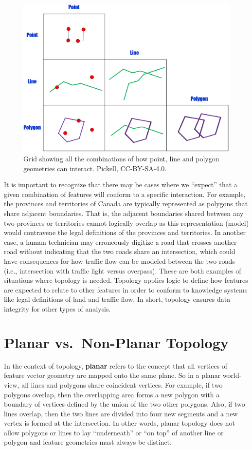 \documentclass[
]{book}
\begin{document}
\begin{figure}
\includegraphics[width=0.75\linewidth]{images/07-topology-grid} \caption{Grid showing all the combinations of how point, line and polygon geometries can interact. Pickell, CC-BY-SA-4.0.}\label{fig:7-topology-grid}
\end{figure}

It is important to recognize that there may be cases where we ``expect'' that a given combination of features will conform to a specific interaction. For example, the provinces and territories of Canada are typically represented as polygons that share adjacent boundaries. That is, the adjacent boundaries shared between any two provinces or territories cannot logically overlap as this representation (model) would contravene the legal definitions of the provinces and territories. In another case, a human technician may erroneously digitize a road that crosses another road without indicating that the two roads share an intersection, which could have consequences for how traffic flow can be modeled between the two roads (i.e., intersection with traffic light versus overpass). These are both examples of situations where topology is needed. Topology applies logic to define how features are expected to relate to other features in order to conform to knowledge systems like legal definitions of land and traffic flow. In short, topology ensures data integrity for other types of analysis.

\section{Planar vs.~Non-Planar Topology}\label{planar-vs.-non-planar-topology}

In the context of topology, \textbf{planar} refers to the concept that all vertices of feature vector geometry are mapped onto the same plane. So in a planar world-view, all lines and polygons share coincident vertices. For example, if two polygons overlap, then the overlapping area forms a new polygon with a boundary of vertices defined by the union of the two other polygons. Also, if two lines overlap, then the two lines are divided into four new segments and a new vertex is formed at the intersection. In other words, planar topology does not allow polygons or lines to lay ``underneath'' or ``on top'' of another line or polygon and feature geometries must always be distinct.
\end{document}
